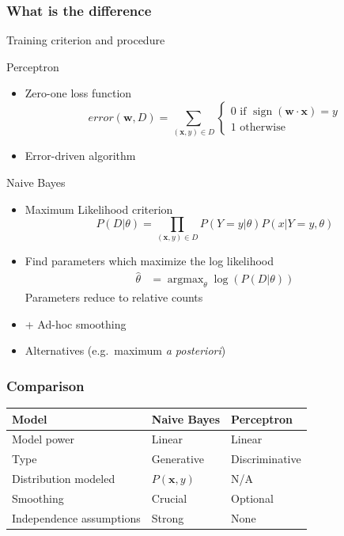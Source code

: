 \documentclass[14pt,mathserif]{beamer}
\DeclareMathOperator*{\argmax}{argmax}
\DeclareMathOperator*{\sign}{sign}
\newcommand{\x}{\mathbf{x}}
\newcommand{\w}{\mathbf{w}}
\begin{document}
\begin{frame}
  \frametitle{What is the difference}
  Training criterion and procedure
  \begin{block}{Perceptron}
    \begin{itemize}
    \item Zero-one loss function    
      \[
      \mathit{error}(\w,D) = \sum_{(\x,y) \in D}
      \begin{cases}
        0 \text{ if } \sign(\w \cdot \x) = y\\
        1 \text{ otherwise }
      \end{cases}
      \]
    \item Error-driven algorithm
    \end{itemize}
  \end{block}
\end{frame}

\begin{frame}
  \begin{block}{ Naive Bayes}
    \begin{itemize}
  \item Maximum Likelihood criterion 
    \[
    P(D|\theta) = \prod_{(\x,y) \in D} P(Y=y|\theta)P(x|Y=y,\theta)
    \]
  \item Find parameters which maximize the log likelihood
    \begin{align}\nonumber
    \hat{\theta} & = \argmax_{\theta} \log(P(D|\theta))
    \end{align}
    Parameters reduce to relative counts
  \item + Ad-hoc smoothing
  \item Alternatives (e.g.\ maximum {\it a posteriori})
  \end{itemize}
\end{block}
\end{frame}

\begin{frame}
  \frametitle{Comparison}
  \begin{center}
  \begin{tabular}{l|l|l}
    Model          & Naive Bayes & Perceptron \\\hline
    Model power    & Linear      & Linear\\
    Type           & Generative  & Discriminative\\
    Distribution 
    modeled        & $P(\x,y)$   & N/A \\
    Smoothing      & Crucial     & Optional\\
    Independence 
    assumptions    & Strong      & None \\
  \end{tabular}   
  \end{center}
\end{frame}
\end{document}

